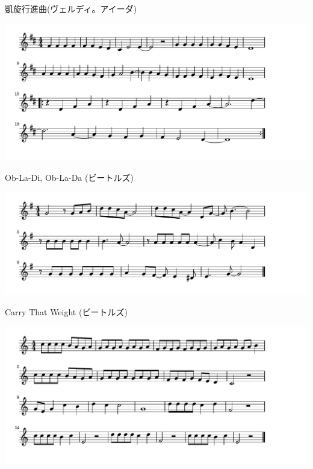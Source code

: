 \documentclass[a4paper]{ltjsarticle}
\begin{document}
\vspace{-10mm} \hspace{10mm}
凱旋行進曲(ヴェルディ。アイーダ)

\includegraphics[clip]{obladi_crop.pdf}

\vspace{-10mm} \hspace{10mm}
Ob-La-Di, Ob-La-Da (ビートルズ)

\includegraphics[clip]{carrythatweight_crop.pdf}

\vspace{-10mm} \hspace{10mm}
Carry That Weight (ビートルズ)

\includegraphics[clip]{acrossuniverse_crop.pdf}
\end{document}
